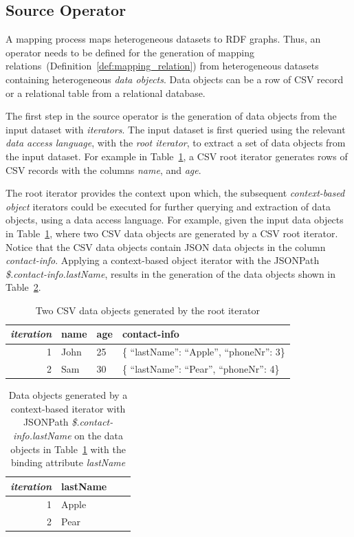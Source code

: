 \subsection{Source Operator}%
\label{sub:source_operator}
A mapping process maps heterogeneous datasets to RDF graphs.
Thus, an operator needs to be defined for the generation of mapping
relations~(Definition~\ref{def:mapping_relation}) from heterogeneous datasets
containing heterogeneous \emph{data objects}.
Data objects can be a row of CSV record or a relational table from a relational
database.

The first step in the source operator is the generation of data objects
from the input dataset with \emph{iterators}.
The input dataset is first queried using the relevant \emph{data access
	language}, with the \emph{root iterator}, to extract a set of data objects
from the input dataset.
For example in Table~\ref{tab:nested_data_objects}, a CSV root iterator
generates rows of CSV records with the columns \emph{name}, and \emph{age}.

The root iterator provides the context upon which, the subsequent \emph{context-based
	object} iterators could be executed for further querying and extraction of data
objects, using a data access language.
For example, given the input data objects in
Table~\ref{tab:nested_data_objects}, where two CSV data objects  are generated
by a CSV root iterator.
Notice that the CSV data objects contain JSON data objects in the column
\emph{contact-info}.
Applying a context-based object iterator with the JSONPath
\emph{\$.contact-info.lastName}, results in the generation of the data objects
shown in Table~\ref{tab:json_extracted_data_object}.


\begin{table}[thb!]
	\centering
	\caption{Two CSV data objects generated by the root iterator}
	\label{tab:nested_data_objects}
	\begin{tabular}{r|lll}
		\emph{iteration} & name & age & contact-info                                 \\
		\hline
		1                & John & 25  & \{ ``lastName'': ``Apple'', ``phoneNr'': 3\} \\
		\hline
		2                & Sam  & 30  & \{ ``lastName'': ``Pear'', ``phoneNr'': 4\}  \\
	\end{tabular}
\end{table}

\begin{table}[thb!]
	\centering
	\caption{Data objects generated by a context-based iterator with JSONPath \break \emph{\$.contact-info.lastName} on the
		data objects in Table~\ref{tab:nested_data_objects} with the binding attribute \emph{lastName}}
	\label{tab:json_extracted_data_object}
	\begin{tabular}{r|lll}
		\emph{iteration} & lastName \\
		\hline
		1                & Apple    \\
		\hline
		2                & Pear     \\
	\end{tabular}
\end{table}

